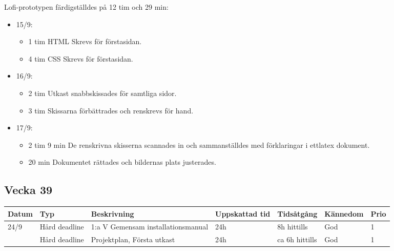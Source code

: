 \documentclass{TDP003mall}
\begin{document}
Lofi-prototypen färdigställdes på 12 tim och 29 min:
\begin{itemize}
	\item 15/9:
	\begin{itemize}
		\item 1 tim HTML Skrevs för förstasidan.
		\item 4 tim CSS Skrevs för förstasidan.
	\end{itemize}
	\item 16/9:
	\begin{itemize}
		\item 2 tim Utkast snabbskissades för samtliga sidor.
		\item 3 tim Skissarna förbättrades och renskrevs för hand.
	\end{itemize}
	\item 17/9:
	\begin{itemize}
		\item 2 tim 9 min De renskrivna skisserna scannades in och sammanställdes med förklaringar i ettlatex dokument.
		\item 20 min Dokumentet rättades och bildernas plats justerades.\\
	\end{itemize}
\end{itemize}

\newpage

\subsection{Vecka 39}
\begin{tabularx}{\linewidth}{|l|l|X|l|l|l|l|}
	\hline
	Datum & Typ           & Beskrivning                        & Uppskattad tid & Tidsåtgång     & Kännedom & Prio \\ [0.5ex]
	\hline                                     
	24/9  & Hård deadline & 1:a V Gemensam installationsmanual & 24h            & 8h hittills    & God      & 1    \\
	\hline                                     
          & Hård deadline & Projektplan, Första utkast         & 24h            & ca 6h hittills & God      & 1    \\
	\hline
\end{tabularx}
\end{document}
